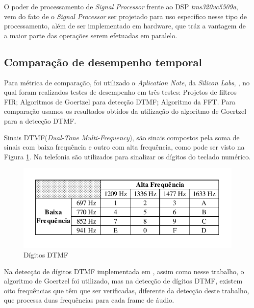 \documentclass[monografia]{subfiles}
\begin{document}
			O poder de processamento de \textit{Signal Processor} frente ao DSP \textit{tms320vc5509a}, vem do fato de o \textit{Signal Processor}
			ser projetado para uso específico nesse tipo de processamento, além de ser implementado em hardware, que tráz a vantagem
			de a maior parte das operações serem efetuadas em paralelo.


		\subsection{Comparação de desempenho temporal}
			Para métrica de comparação, foi utilizado o \textit{Aplication Note}, da \textit{Silicon Labs}, \cite{siliconLabs1}, no qual foram 
			realizados testes de desempenho em três testes: Projetos de filtros FIR; Algoritmos de Goertzel para
			detecção DTMF; Algoritmo da FFT. Para comparação usamos os resultados obtidos da utilização do algoritmo de Goertzel para a detecção DTMF.



			Sinais DTMF(\textit{Dual-Tone Multi-Frequency}), são sinais compostos pela soma de sinais com baixa frequência e outro com alta frequência,
			como pode ser visto na Figura \ref{fig:dtmfDigits}.
			Na telefonia são utilizados	para sinalizar os dígitos do teclado numérico. 

				\begin{figure}[!h]
				\centering 
				\includegraphics[scale=1]{img/DTMF.pdf}
				\caption{Dígitos DTMF}
				\label{fig:dtmfDigits}
				\end{figure}

			Na detecção de dígitos DTMF implementada em \cite{siliconLabs1}, assim como nesse trabalho, o algoritmo de Goertzel foi utilizado, mas na detecção 
			de dígitos DTMF, existem 
			oito frequências que têm que ser verificadas, diferente da detecção deste trabalho, que processa duas frequências para cada frame de áudio.
\end{document}
